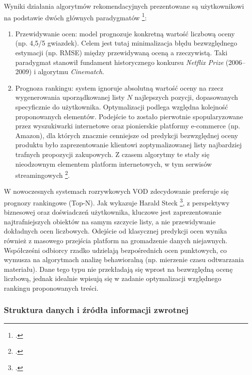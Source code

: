 Wyniki działania algorytmów rekomendacyjnych prezentowane są użytkownikowi na podstawie dwóch głównych paradygmatów \footcite{malinowskiZastosowanieGrafowSieci2021}:
\begin{enumerate}
    \item Przewidywanie ocen: model prognozuje konkretną wartość liczbową oceny (np. 4,5/5 gwiazdek). Celem jest tutaj minimalizacja błędu bezwzględnego estymacji (np. RMSE) między przewidywaną oceną a rzeczywistą. Taki paradygmat stanowił fundament historycznego konkursu \foreignlanguage{english}{\textit{Netflix Prize}} (2006--2009) i algorytmu \foreignlanguage{english}{\textit{Cinematch}}.
    \item Prognoza rankingu: system ignoruje absolutną wartość oceny na rzecz wygenerowania uporządkowanej listy $N$ najlepszych pozycji, dopasowanych specyficznie do użytkownika. Optymalizacji podlega względna kolejność proponowanych elementów. Podejście to zostało pierwotnie spopularyzowane przez wyszukiwarki internetowe oraz pionierskie platformy e-commerce (np. Amazon), dla których znacznie cenniejsze od predykcji bezwzględnej oceny produktu było zaprezentowanie klientowi zoptymalizowanej listy najbardziej trafnych propozycji zakupowych. Z czasem algorytmy te stały się nieodzownym elementem platform internetowych, w tym serwisów streamingowych \footcite{deshpandeItembasedTopNRecommendationStyczen012004}.
\end{enumerate}
W nowoczesnych systemach rozrywkowych VOD zdecydowanie preferuje się prognozy rankingowe (Top-N). Jak wykazuje Harald Steck \footcite{steckEvaluationRecommendationsRatingprediction2013}, z perspektywy biznesowej oraz doświadczeń użytkownika, kluczowe jest zaprezentowanie najtrafniejszych obiektów na samym szczycie listy, a nie przewidywanie dokładnych ocen liczbowych. Odejście od klasycznej predykcji ocen wynika również z masowego przejścia platform na gromadzenie danych niejawnych. Współcześni odbiorcy rzadko udzielają bezpośrednich ocen punktowych, co wymusza na algorytmach analizę behawioralną (np. mierzenie czasu odtwarzania materiału). Dane tego typu nie przekładają się wprost na bezwzględną ocenę liczbową, jednak idealnie wpisują się w zadanie optymalizacji względnego rankingu proponowanych treści.

\subsubsection{Struktura danych i źródła informacji zwrotnej} %

